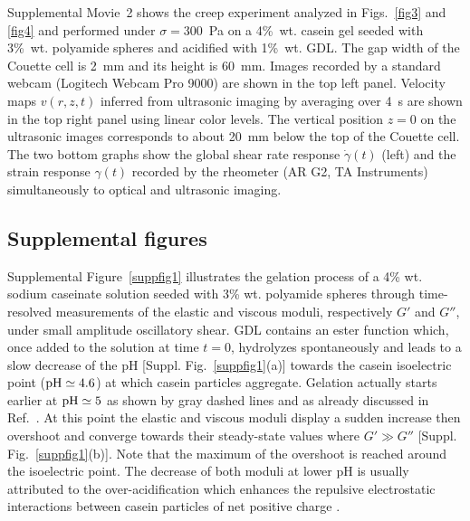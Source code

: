 \documentclass[twocolumn,superscriptaddress,showpacs,preprintnumbers,amsmath,amssymb,prl]{revtex4}
\newcommand\gp{\dot\gamma}
\begin{document}
Supplemental Movie~2 shows the creep experiment analyzed in Figs.~\ref{fig3} and \ref{fig4} and performed under $\sigma=300$~Pa on a 4\%~wt. casein gel seeded with 3\%~wt. polyamide spheres and acidified with 1\%~wt. GDL. The gap width of the Couette cell is 2~mm and its height is 60~mm. Images recorded by a standard webcam (Logitech Webcam Pro 9000) are shown in the top left panel. Velocity maps $v(r,z,t)$ inferred from ultrasonic imaging by averaging over 4~s are shown in the top right panel using linear color levels. The vertical position $z=0$ on the ultrasonic images corresponds to about 20~mm below the top of the Couette cell. The two bottom graphs show the global shear rate response $\gp(t)$ (left) and the strain response $\gamma(t)$ recorded by the rheometer (AR G2, TA Instruments) simultaneously to optical and ultrasonic imaging.

\subsection*{Supplemental figures} 

Supplemental Figure~\ref{suppfig1} illustrates the gelation process of a 4\% wt. sodium caseinate solution seeded with 3\% wt. polyamide spheres through time-resolved measurements of the elastic and viscous moduli, respectively $G'$ and $G''$, under small amplitude oscillatory shear. GDL contains an ester function which, once added to the solution at time $t=0$, hydrolyzes spontaneously and leads to a slow decrease of the pH [Suppl. Fig.~\ref{suppfig1}(a)] towards the casein isoelectric point (${\rm pH}\simeq 4.6$) at which casein particles aggregate. Gelation actually starts earlier at ${\rm pH}\simeq 5$ as shown by gray dashed lines and as already discussed in Ref.~\cite{Lucey:1998supp}. At this point the elastic and viscous moduli display a sudden increase then overshoot and converge towards their steady-state values where $G'\gg G''$ [Suppl. Fig.~\ref{suppfig1}(b)]. Note that the maximum of the overshoot is reached around the isoelectric point. The decrease of both moduli at lower pH is usually attributed to the over-acidification which enhances the repulsive electrostatic interactions between casein particles of net positive charge \cite{Dickinson:2002supp}.   
\end{document}
